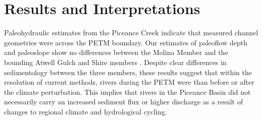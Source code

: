 \documentclass[draft]{compact_proposal}
\begin{document}
% 
% 

\section{Results and Interpretations}


Paleohydraulic estimates from the Piceance Creek indicate that measured channel geometries were  across the PETM boundary.
Our estimates of paleoflow depth and paleoslope show no differences between the Molina Member and the bounding Atwell Gulch and Shire members .
Despite clear differences in sedimentology between the three members, these results suggest that within the resolution of current methods, rivers during the PETM were  than before or after the climate perturbation.
This implies that rivers in the Piceance Basin did not necessarily carry an increased sediment flux or higher discharge as a result of changes to regional climate and hydrological cycling.
\end{document}

